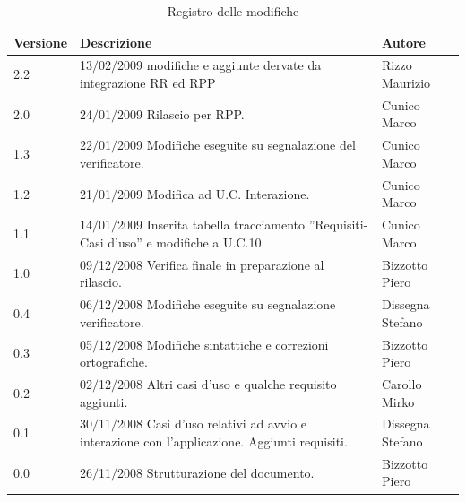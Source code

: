 \begin{center}
	\begin{table}[h]
		  \begin{tabular*}
			{1\textwidth}%
					 {@{\extracolsep{\fill}}|p{}|p{}|p{}|}
		 \hline
			\textbf{Versione}  & \textbf{Descrizione} & \textbf{Autore} \\

                \hline
                2.2 & 13$\slash$02$\slash$2009 modifiche e aggiunte dervate da integrazione RR ed RPP & Rizzo Maurizio\\
                \hline
				2.0 & 24$\slash$01$\slash$2009 Rilascio per RPP. & Cunico Marco \\
		\hline
				1.3 & 22$\slash$01$\slash$2009 Modifiche eseguite su segnalazione del verificatore.  & Cunico Marco \\
                \hline
				1.2 & 21$\slash$01$\slash$2009 Modifica ad U.C. Interazione.  & Cunico Marco \\
                \hline
				1.1 & 14$\slash$01$\slash$2009 Inserita tabella tracciamento ''Requisiti-Casi d'uso'' e modifiche a U.C.10. & Cunico Marco \\
				\hline
				1.0 & 09$\slash$12$\slash$2008  Verifica finale in preparazione al rilascio. & Bizzotto Piero \\
				\hline
				0.4 & 06$\slash$12$\slash$2008 Modifiche eseguite su segnalazione verificatore. & Dissegna Stefano \\
				\hline
				0.3 & 05$\slash$12$\slash$2008 Modifiche sintattiche e correzioni ortografiche. & Bizzotto Piero \\
				\hline
				0.2 & 02$\slash$12$\slash$2008 Altri casi d'uso e qualche requisito aggiunti. & Carollo Mirko \\
                \hline
                0.1 & 30$\slash$11$\slash$2008 Casi d'uso relativi ad avvio e interazione con l'applicazione. Aggiunti requisiti. & Dissegna Stefano \\
				\hline	
    	 	     0.0 & 26$\slash$11$\slash$2008 Strutturazione del documento. & Bizzotto Piero \\

		\hline %
		\end{tabular*}
	\caption{Registro delle modifiche} %
	\label{tab:modifiche}
	\end{table}
\end{center}

